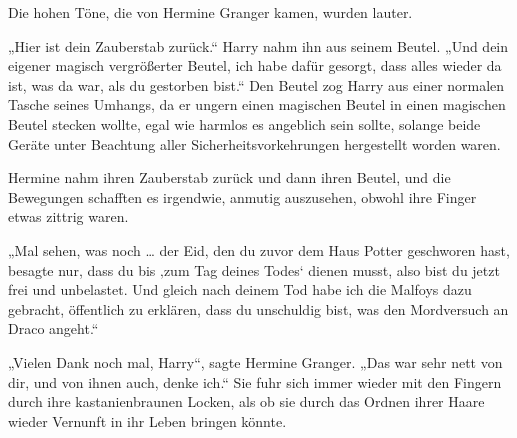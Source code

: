 Die hohen Töne, die von Hermine Granger kamen, wurden lauter.

„Hier ist dein Zauberstab zurück.“
Harry nahm ihn aus seinem Beutel.
„Und dein eigener magisch vergrößerter Beutel, ich habe dafür gesorgt, dass alles wieder da ist, was da war, als du gestorben bist.“
Den Beutel zog Harry aus einer normalen Tasche seines Umhangs, da er ungern einen magischen Beutel in einen magischen Beutel stecken wollte, egal wie harmlos es angeblich sein sollte, solange beide Geräte unter Beachtung aller Sicherheitsvorkehrungen hergestellt worden waren.

Hermine nahm ihren Zauberstab zurück und dann ihren Beutel, und die Bewegungen schafften es irgendwie, anmutig auszusehen, obwohl ihre Finger etwas zittrig waren.

„Mal sehen, was noch … der Eid, den du zuvor dem Haus Potter geschworen hast, besagte nur, dass du bis ‚zum Tag deines Todes‘ dienen musst, also bist du jetzt frei und unbelastet. Und gleich nach deinem Tod habe ich die Malfoys dazu gebracht, öffentlich zu erklären, dass du unschuldig bist, was den Mordversuch an Draco angeht.“

„Vielen Dank noch mal, Harry“, sagte Hermine Granger.
„Das war sehr nett von dir, und von ihnen auch, denke ich.“
Sie fuhr sich immer wieder mit den Fingern durch ihre kastanienbraunen Locken, als ob sie durch das Ordnen ihrer Haare wieder Vernunft in ihr Leben bringen könnte.

